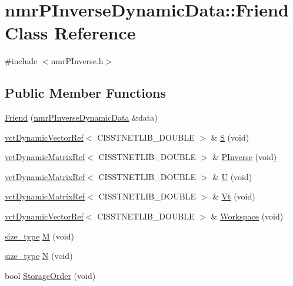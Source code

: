 \hypertarget{classnmr_p_inverse_dynamic_data_1_1_friend}{}\section{nmr\+P\+Inverse\+Dynamic\+Data\+:\+:Friend Class Reference}
\label{classnmr_p_inverse_dynamic_data_1_1_friend}


{\ttfamily \#include $<$nmr\+P\+Inverse.\+h$>$}

\subsection*{Public Member Functions}
\begin{DoxyCompactItemize}
\item 
\hyperlink{classnmr_p_inverse_dynamic_data_1_1_friend_acf0196a1908ee13e41353ffae6072fba}{Friend} (\hyperlink{classnmr_p_inverse_dynamic_data}{nmr\+P\+Inverse\+Dynamic\+Data} \&data)
\item 
\hyperlink{classvct_dynamic_vector_ref}{vct\+Dynamic\+Vector\+Ref}$<$ C\+I\+S\+S\+T\+N\+E\+T\+L\+I\+B\+\_\+\+D\+O\+U\+B\+L\+E $>$ \& \hyperlink{classnmr_p_inverse_dynamic_data_1_1_friend_aa21fa5551ee097212347735df394b596}{S} (void)
\item 
\hyperlink{classvct_dynamic_matrix_ref}{vct\+Dynamic\+Matrix\+Ref}$<$ C\+I\+S\+S\+T\+N\+E\+T\+L\+I\+B\+\_\+\+D\+O\+U\+B\+L\+E $>$ \& \hyperlink{classnmr_p_inverse_dynamic_data_1_1_friend_aa94f4cd2c700eb3b527bd5f84d23bf3d}{P\+Inverse} (void)
\item 
\hyperlink{classvct_dynamic_matrix_ref}{vct\+Dynamic\+Matrix\+Ref}$<$ C\+I\+S\+S\+T\+N\+E\+T\+L\+I\+B\+\_\+\+D\+O\+U\+B\+L\+E $>$ \& \hyperlink{classnmr_p_inverse_dynamic_data_1_1_friend_a2c1c53c318c3a47ccb5655598fec0bec}{U} (void)
\item 
\hyperlink{classvct_dynamic_matrix_ref}{vct\+Dynamic\+Matrix\+Ref}$<$ C\+I\+S\+S\+T\+N\+E\+T\+L\+I\+B\+\_\+\+D\+O\+U\+B\+L\+E $>$ \& \hyperlink{classnmr_p_inverse_dynamic_data_1_1_friend_aa436a1939f0f59d969ca534bb4f6c075}{Vt} (void)
\item 
\hyperlink{classvct_dynamic_vector_ref}{vct\+Dynamic\+Vector\+Ref}$<$ C\+I\+S\+S\+T\+N\+E\+T\+L\+I\+B\+\_\+\+D\+O\+U\+B\+L\+E $>$ \& \hyperlink{classnmr_p_inverse_dynamic_data_1_1_friend_ab25993edd9af436758b7a817b3042a87}{Workspace} (void)
\item 
\hyperlink{classnmr_p_inverse_dynamic_data_a059041cc0fb800515bffe5bb351b01cb}{size\+\_\+type} \hyperlink{classnmr_p_inverse_dynamic_data_1_1_friend_a39f5079fc3a27978e2f7065c191f766c}{M} (void)
\item 
\hyperlink{classnmr_p_inverse_dynamic_data_a059041cc0fb800515bffe5bb351b01cb}{size\+\_\+type} \hyperlink{classnmr_p_inverse_dynamic_data_1_1_friend_a0787ab8380e4d38be18809993b2db30a}{N} (void)
\item 
bool \hyperlink{classnmr_p_inverse_dynamic_data_1_1_friend_acb0dd75ce192fa03c0f3723f1eeedb0d}{Storage\+Order} (void)
\end{DoxyCompactItemize}


